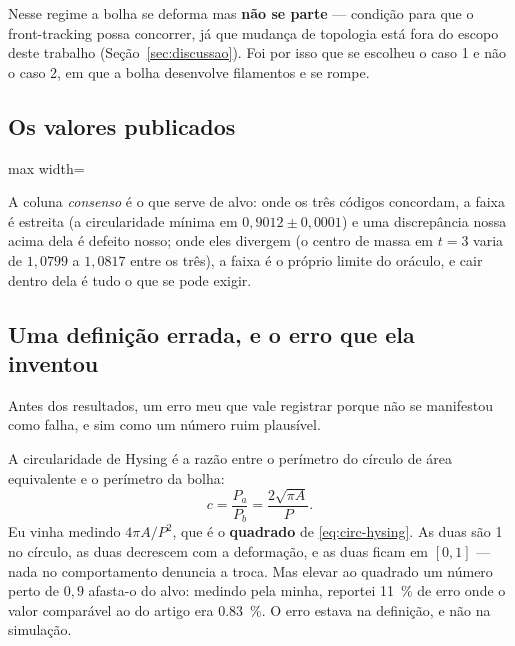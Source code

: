 Nesse regime a bolha se deforma mas \textbf{n\~ao se parte} --- condi\c{c}\~ao
para que o front-tracking possa concorrer, j\'a que mudan\c{c}a de topologia est\'a
fora do escopo deste trabalho (Se\c{c}\~ao~\ref{sec:discussao}). Foi por isso
que se escolheu o caso 1 e n\~ao o caso 2, em que a bolha desenvolve filamentos
e se rompe.

\subsection{Os valores publicados}

\begin{adjustbox}{max width=\linewidth}
\end{adjustbox}

A coluna \emph{consenso} \'e o que serve de alvo: onde os tr\^es c\'odigos
concordam, a faixa \'e estreita (a circularidade m\'inima em
$0{,}9012\pm0{,}0001$) e uma discrep\^ancia nossa acima dela \'e defeito nosso;
onde eles divergem (o centro de massa em $t=3$ varia de $1{,}0799$ a $1{,}0817$
entre os tr\^es), a faixa \'e o pr\'oprio limite do or\'aculo, e cair dentro
dela \'e tudo o que se pode exigir.

\subsection{Uma defini\c{c}\~ao errada, e o erro que ela inventou}

Antes dos resultados, um erro meu que vale registrar porque n\~ao se manifestou
como falha, e sim como um n\'umero ruim plaus\'ivel.

A circularidade de Hysing \'e a raz\~ao entre o per\'imetro do c\'irculo de
\'area equivalente e o per\'imetro da bolha:
\begin{equation}
  c = \frac{P_a}{P_b} = \frac{2\sqrt{\pi A}}{P} .
  \label{eq:circ-hysing}
\end{equation}
Eu vinha medindo $4\pi A/P^{2}$, que \'e o \textbf{quadrado} de
\eqref{eq:circ-hysing}. As duas s\~ao 1 no c\'irculo, as duas decrescem com a
deforma\c{c}\~ao, e as duas ficam em $[0,1]$ --- nada no comportamento denuncia a
troca. Mas elevar ao quadrado um n\'umero perto de $0{,}9$ afasta-o do alvo:
medindo pela minha, reportei \SI{11}{\percent} de erro onde o valor compar\'avel
ao do artigo era \SI{0.83}{\percent}. O erro estava na defini\c{c}\~ao, e n\~ao
na simula\c{c}\~ao.


